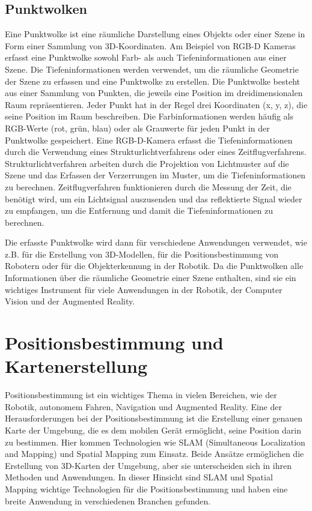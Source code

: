 \subsection{Punktwolken}
Eine Punktwolke ist eine räumliche Darstellung eines Objekts oder einer Szene in Form einer Sammlung von 3D-Koordinaten. Am Beispiel von \ac{RGB-D} Kameras erfasst eine Punktwolke sowohl Farb- als auch Tiefeninformationen aus einer Szene.
Die Tiefeninformationen werden verwendet, um die räumliche Geometrie der Szene zu erfassen und eine Punktwolke zu erstellen.
Die Punktwolke besteht aus einer Sammlung von Punkten, die jeweils eine Position im dreidimensionalen Raum repräsentieren. Jeder Punkt hat in der Regel drei Koordinaten (x, y, z), die seine Position im Raum beschreiben. Die Farbinformationen werden häufig als RGB-Werte (rot, grün, blau) oder als Grauwerte für jeden Punkt in der Punktwolke gespeichert.
Eine \ac{RGB-D}-Kamera erfasst die Tiefeninformationen durch die Verwendung eines Strukturlichtverfahrens oder eines Zeitflugverfahrens. Strukturlichtverfahren arbeiten durch die Projektion von Lichtmuster auf die Szene und das Erfassen der Verzerrungen im Muster, um die Tiefeninformationen zu berechnen. Zeitflugverfahren funktionieren durch die Messung der Zeit, die benötigt wird, um ein Lichtsignal auszusenden und das reflektierte Signal wieder zu empfangen, um die Entfernung und damit die Tiefeninformationen zu berechnen.

Die erfasste Punktwolke wird dann für verschiedene Anwendungen verwendet, wie z.B. für die Erstellung von 3D-Modellen, für die Positionsbestimmung von Robotern oder für die Objekterkennung in der Robotik. Da die Punktwolken alle Informationen über die räumliche Geometrie einer Szene enthalten, sind sie ein wichtiges Instrument für viele Anwendungen in der Robotik, der Computer Vision und der Augmented Reality.


\section{Positionsbestimmung und Kartenerstellung}
\label{positionsbestimmung:section}
Positionsbestimmung ist ein wichtiges Thema in vielen Bereichen, wie der Robotik, autonomem Fahren, Navigation und Augmented Reality. Eine der Herausforderungen bei der Positionsbestimmung ist die Erstellung einer genauen Karte der Umgebung, die es dem mobilen Gerät ermöglicht, seine Position darin zu bestimmen. Hier kommen Technologien wie SLAM (Simultaneous Localization and Mapping) und Spatial Mapping zum Einsatz. Beide Ansätze ermöglichen die Erstellung von 3D-Karten der Umgebung, aber sie unterscheiden sich in ihren Methoden und Anwendungen. In dieser Hinsicht sind SLAM und Spatial Mapping wichtige Technologien für die Positionsbestimmung und haben eine breite Anwendung in verschiedenen Branchen gefunden.


